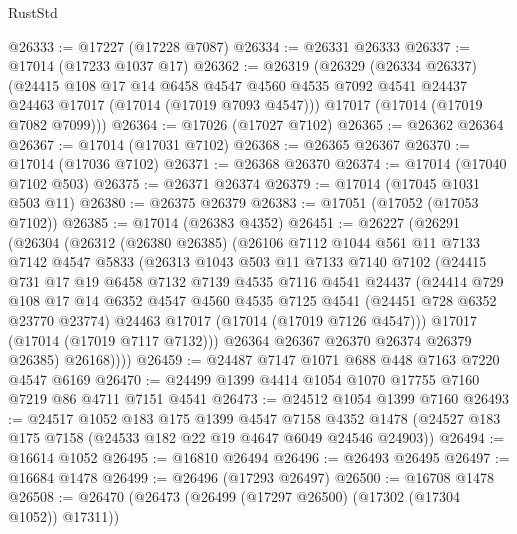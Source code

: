 \begin{lexlean}{RustStd}
\begin{coremodule}
{\begin{coremodule}
{{{{{{{{{{{{{{{{{{{{{{{{{{{{{{{{{{{{{{{{{{{{{{{{{{{{{{{@26333 := @17227 (@17228 @7087)
@26334 := @26331 @26333
@26337 := @17014 (@17233 @1037 @17)
@26362 := @26319
    (@26329
      (@26334 @26337)
      (@24415
        @108
        @17
        @14
        @6458
        @4547
        @4560
        @4535
        @7092
        @4541
        @24437
        @24463
        @17017
        (@17014 (@17019 @7093 @4547)))
      @17017
      (@17014 (@17019 @7082 @7099)))
@26364 := @17026 (@17027 @7102)
@26365 := @26362 @26364
@26367 := @17014 (@17031 @7102)
@26368 := @26365 @26367
@26370 := @17014 (@17036 @7102)
@26371 := @26368 @26370
@26374 := @17014 (@17040 @7102 @503)
@26375 := @26371 @26374
@26379 := @17014 (@17045 @1031 @503 @11)
@26380 := @26375 @26379
@26383 := @17051 (@17052 (@17053 @7102))
@26385 := @17014 (@26383 @4352)
@26451 := @26227
    (@26291
      (@26304
        (@26312
          (@26380 @26385)
          (@26106
            @7112
            @1044
            @561
            @11
            @7133
            @7142
            @4547
            @5833
            (@26313
              @1043
              @503
              @11
              @7133
              @7140
              @7102
              (@24415
                @731
                @17
                @19
                @6458
                @7132
                @7139
                @4535
                @7116
                @4541
                @24437
                (@24414
                  @729
                  @108
                  @17
                  @14
                  @6352
                  @4547
                  @4560
                  @4535
                  @7125
                  @4541
                  (@24451 @728 @6352 @23770 @23774)
                  @24463
                  @17017
                  (@17014 (@17019 @7126 @4547)))
                @17017
                (@17014 (@17019 @7117 @7132)))
              @26364
              @26367
              @26370
              @26374
              @26379
              @26385)
            @26168))))
@26459 := @24487 @7147 @1071 @688 @448 @7163 @7220 @4547 @6169
@26470 := @24499 @1399 @4414 @1054 @1070 @17755 @7160 @7219 @86 @4711 @7151 @4541
@26473 := @24512 @1054 @1399 @7160
@26493 := @24517
    @1052
    @183
    @175
    @1399
    @4547
    @7158
    @4352
    @1478
    (@24527 @183 @175 @7158 (@24533 @182 @22 @19 @4647 @6049 @24546 @24903))
@26494 := @16614 @1052
@26495 := @16810 @26494
@26496 := @26493 @26495
@26497 := @16684 @1478
@26499 := @26496 (@17293 @26497)
@26500 := @16708 @1478
@26508 := @26470 (@26473 (@26499 (@17297 @26500) (@17302 (@17304 @1052)) @17311))
}}}}}}}}}}}}}}}}}}}}}}}}}}}}}}}}}}}}}}}}}}}}}}}}}}}}}}}
\end{coremodule}}
\end{coremodule}
\end{lexlean}
